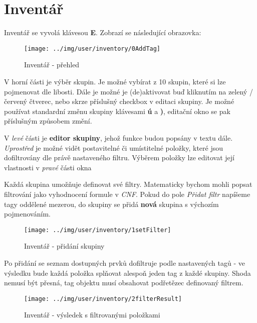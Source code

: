 
\section{Inventář}

Inventář se vyvolá klávesou \textbf{E}. Zobrazí se následující obrazovka:

\begin{figure}[!ht]\centering
\texttt{[image: ../img/user/inventory/0AddTag]}

\caption{Inventář - přehled}
\label{fig:user_inventory_0AddTag}

\end{figure}

\FloatBarrier

V horní části je výběr skupin. Je možné vybírat z 10 skupin, které si lze pojmenovat dle libosti. Dále je možné je (de)aktivovat buď kliknutím na zelený / červený čtverec, nebo skrze příslušný checkbox v editaci skupiny.
Je možné používat standardní změnu skupiny klávesami \textbf{ú} a \textbf{)}, editační okno se pak příslušným způsobem změní. 

V \textit{levé} části je \textbf{editor skupiny}, jehož funkce budou popsány v textu dále. \textit{Uprostřed} je možné vidět postavitelné či umístitelné položky, které jsou dofiltrovány dle právě nastaveného filtru. Výběrem položky lze editovat její vlastnosti v \textit{pravé} části okna

\FloatBarrier

Každá skupina umožňuje definovat své filtry. Matematicky bychom mohli popsat filtrování jako vyhodnocení formule v \textit{CNF}. Pokud do pole \textit{Přidat filtr} napíšeme tagy oddělené mezerou, do skupiny se přidá \textbf{nová} skupina s výchozím pojmenováním.

\begin{figure}[!ht]\centering
\texttt{[image: ../img/user/inventory/1setFilter]}

\caption{Inventář - přidání skupiny}
\label{fig:user_inventory_1setFilter}

\end{figure}

\FloatBarrier

Po přidání se seznam dostupných prvků dofiltruje podle nastavených tagů - ve výsledku bude každá položka splňovat alespoň jeden tag z každé skupiny. Shoda nemusí být přesná, tag objektu musí obsahovat podřetězec definovaný filtrem.
\begin{figure}[!ht]\centering
\texttt{[image: ../img/user/inventory/2filterResult]}

\caption{Inventář - výsledek s filtrovanými položkami}
\label{fig:user_inventory_2filterResult}

\end{figure}

